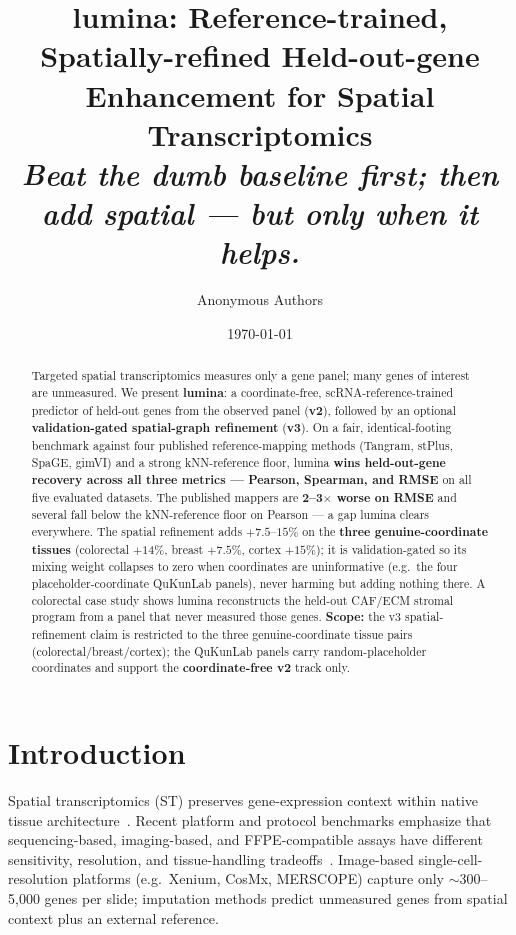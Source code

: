 \documentclass[10pt,letterpaper]{article}
\title{lumina: Reference-trained, Spatially-refined Held-out-gene Enhancement
for Spatial Transcriptomics\\[0.4em]
\large\itshape Beat the dumb baseline first; then add spatial --- but only when it helps.}
\author[1]{Anonymous Authors}
\affil[1]{Author affiliations to be added before submission}
\date{\today}
\begin{document}
\maketitle
\linenumbers

\begin{abstract}
Targeted spatial transcriptomics measures only a gene panel; many genes of interest
are unmeasured. We present \textbf{lumina}: a coordinate-free, scRNA-reference-trained
predictor of held-out genes from the observed panel (\textbf{v2}), followed by an optional
\textbf{validation-gated spatial-graph refinement} (\textbf{v3}). On a fair,
identical-footing benchmark against four published reference-mapping methods
(Tangram, stPlus, SpaGE, gimVI) and a strong kNN-reference floor, lumina
\textbf{wins held-out-gene recovery across all three metrics --- Pearson, Spearman,
and RMSE} on all five evaluated datasets. The published mappers are \textbf{2--3$\times$
worse on RMSE} and several fall below the kNN-reference floor on Pearson --- a gap
lumina clears everywhere. The spatial refinement adds $+7.5$--$15\%$ on the
\textbf{three genuine-coordinate tissues} (colorectal $+14\%$, breast $+7.5\%$,
cortex $+15\%$); it is validation-gated so its mixing weight collapses to zero when
coordinates are uninformative (e.g.\ the four placeholder-coordinate QuKunLab panels),
never harming but adding nothing there. A colorectal case study shows lumina
reconstructs the held-out CAF/ECM stromal program from a panel that never measured
those genes. \textbf{Scope:} the v3 spatial-refinement claim is restricted to the
three genuine-coordinate tissue pairs (colorectal/breast/cortex); the QuKunLab panels
carry random-placeholder coordinates and support the \textbf{coordinate-free v2} track only.
\end{abstract}

\section{Introduction}
\label{sec:intro}

Spatial transcriptomics (ST) preserves gene-expression context within native tissue
architecture~\cite{Wolf2018Scanpy,Williams2022SpatialTranscriptomics}. Recent platform
and protocol benchmarks emphasize that sequencing-based, imaging-based, and
FFPE-compatible assays have different sensitivity, resolution, and tissue-handling
tradeoffs~\cite{You2024SequencingST,Cervilla2026SixCancerPlatforms,Wang2025ImagingFFPE,%
Rademacher2025TumorST}. Image-based single-cell-resolution platforms (e.g.\ Xenium,
CosMx, MERSCOPE) capture only $\sim$300--5{,}000 genes per slide; imputation methods
predict unmeasured genes from spatial context plus an external reference.
\end{document}

